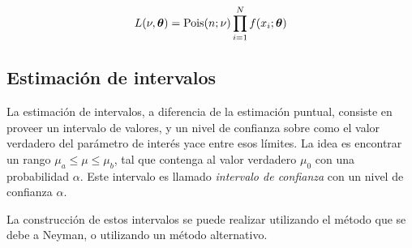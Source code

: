 \begin{equation}
  L(\nu,\bm{\theta}) = \operatorname{Pois}(n;\nu) \prod_{i=1}^{N} f(x_i; \bm{\theta})
\end{equation}


\subsection{Estimación de intervalos}


La estimación de intervalos, a diferencia de la estimación puntual,
consiste en proveer un intervalo de valores, y un nivel de
confianza sobre como el valor verdadero del parámetro de interés yace entre esos
límites. La idea es encontrar un rango $\mu_a \leq \mu \leq \mu_b$, tal
que contenga al valor verdadero $\mu_0$ con una probabilidad $\alpha$. Este
intervalo es llamado \emph{intervalo de confianza} con un nivel de confianza
$\alpha$.

La construcción de estos intervalos se puede realizar utilizando el método que
se debe a Neyman, o utilizando un método alternativo.







